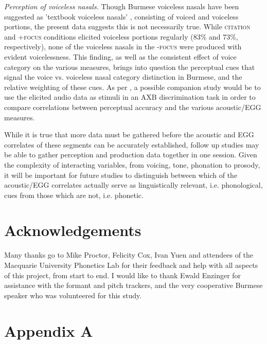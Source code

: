 \documentclass[12pt]{article}
\newcommand{\condc}{\textsc{citation }}
\newcommand{\condf}{\textsc{+focus }}
\newcommand{\condu}{\textsc{-focus }}
\begin{document}
\emph{Perception of voiceless nasals.} Though Burmese voiceless nasals have been suggested as 'textbook voiceless nasals' \citep[][p. 80]{bhaskararao1991two}, consisting of voiced and voiceless portions, the present data suggests this is not necessarily true. While \condc and \condf conditions elicited voiceless portions regularly (83\% and 73\%, respectively), none of the voiceless nasals in the \condu were produced with evident voicelessness. This finding, as well as the consistent effect of voice category on the various measures, brings into question the perceptual cues that signal the voice vs. voiceless nasal category distinction in Burmese, and the relative weighting of these cues. As per \citet{kuang2014vocal}, a possible companion study would be to use the elicited audio data as stimuli in an AXB discrimination task in order to compare correlations between perceptual accuracy and the various acoustic/EGG measures.

While it is true that more data must be gathered before the acoustic and EGG correlates of these segments can be accurately established, follow up studies may be able to gather perception and production data together in one session. Given the complexity of interacting variables, from voicing, tone, phonation to prosody, it will be important for future studies to distinguish between which of the acoustic/EGG correlates actually serve as linguistically relevant, i.e. phonological, cues from those which are not, i.e. phonetic.


\newpage
\section{Acknowledgements}

Many thanks go to Mike Proctor, Felicity Cox, Ivan Yuen and attendees of the Macquarie University Phonetics Lab for their feedback and help with all aspects of this project, from start to end. I would like to thank Ewald Enzinger for assistance with the formant and pitch trackers, and the very cooperative Burmese speaker who \lbrack was\rbrack \hspace{0.1em} volunteered for this study.

\onehalfspacing
\nocite{*}
\printbibliography

\singlespacing
\newpage
\section{Appendix A}
\end{document}
